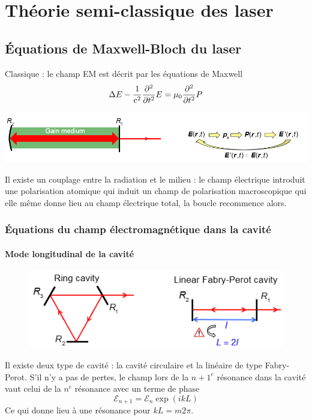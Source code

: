 \chapter{Théorie semi-classique des laser}
\section{Équations de Maxwell-Bloch du laser}
Classique : le champ EM est décrit par les équations de Maxwell
\begin{equation}
\Delta E - \frac{1}{{{{\rm{c}}^2}}}\frac{{{\partial ^2}}}{{\partial {t^2}}}E = {\rm{ }}{\mu _0}\frac{{{\partial ^2}}}{{\partial {t^2}}}P
\end{equation}

\begin{center}
	\includegraphics[scale=0.65]{ch3/image1.png}
\end{center}
Il existe un couplage entre la radiation et le milieu : le champ électrique introduit une 
polarisation atomique qui induit un champ de polarisation macroscopique qui elle même 
donne lieu au champ électrique total, la boucle recommence alors.

\subsection{Équations du champ électromagnétique dans la cavité}
\subsubsection{Mode longitudinal de la cavité}
	\begin{figure}
	\vspace{-5mm}
	\includegraphics[scale=0.6]{ch3/image2.png}
	\end{figure}
Il existe deux type de cavité : la cavité circulaire et la linéaire de type Fabry-Perot. S'il 
n'y a pas de pertes, le champ lors de la $n+1^e$ résonance dans la cavité vaut celui de la $n^e$ 
résonance avec un terme de phase
\begin{equation}
\mathcal{E}_{n+1}=\mathcal{E}_{n}\exp(ikL)
\end{equation}
Ce qui donne lieu à une résonance pour $kL = m2\pi$. 

